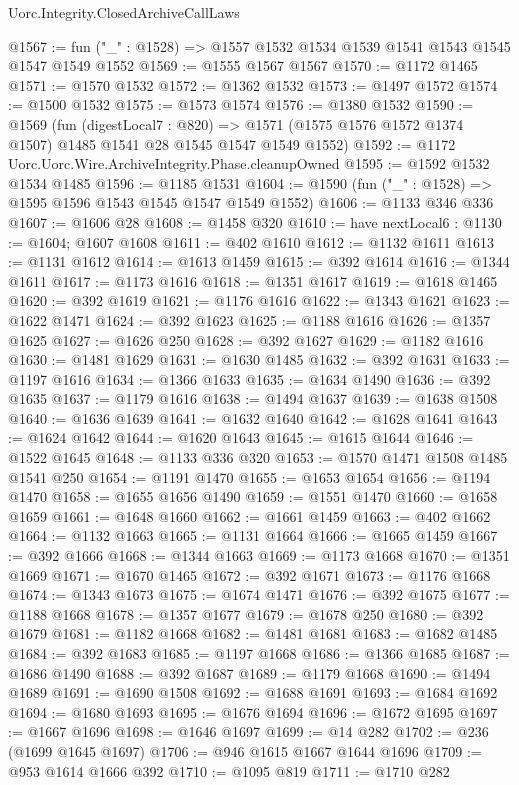 \begin{lexlean}{Uorc.Integrity.ClosedArchiveCallLaws}
\begin{coremodule}
@1567 := fun ("_" : @1528) => @1557 @1532 @1534 @1539 @1541 @1543 @1545 @1547 @1549 @1552
@1569 := @1555 @1567 @1567
@1570 := @1172 @1465
@1571 := @1570 @1532
@1572 := @1362 @1532
@1573 := @1497 @1572
@1574 := @1500 @1532
@1575 := @1573 @1574
@1576 := @1380 @1532
@1590 := @1569
    (fun (digestLocal7 : @820) =>
    @1571 (@1575 @1576 @1572 @1374 @1507) @1485 @1541 @28 @1545 @1547 @1549 @1552)
@1592 := @1172 Uorc.Uorc.Wire.ArchiveIntegrity.Phase.cleanupOwned
@1595 := @1592 @1532 @1534 @1485
@1596 := @1185 @1531
@1604 := @1590 (fun ("_" : @1528) => @1595 @1596 @1543 @1545 @1547 @1549 @1552)
@1606 := @1133 @346 @336
@1607 := @1606 @28
@1608 := @1458 @320
@1610 := have nextLocal6 : @1130 := @1604; @1607 @1608
@1611 := @402 @1610
@1612 := @1132 @1611
@1613 := @1131 @1612
@1614 := @1613 @1459
@1615 := @392 @1614
@1616 := @1344 @1611
@1617 := @1173 @1616
@1618 := @1351 @1617
@1619 := @1618 @1465
@1620 := @392 @1619
@1621 := @1176 @1616
@1622 := @1343 @1621
@1623 := @1622 @1471
@1624 := @392 @1623
@1625 := @1188 @1616
@1626 := @1357 @1625
@1627 := @1626 @250
@1628 := @392 @1627
@1629 := @1182 @1616
@1630 := @1481 @1629
@1631 := @1630 @1485
@1632 := @392 @1631
@1633 := @1197 @1616
@1634 := @1366 @1633
@1635 := @1634 @1490
@1636 := @392 @1635
@1637 := @1179 @1616
@1638 := @1494 @1637
@1639 := @1638 @1508
@1640 := @1636 @1639
@1641 := @1632 @1640
@1642 := @1628 @1641
@1643 := @1624 @1642
@1644 := @1620 @1643
@1645 := @1615 @1644
@1646 := @1522 @1645
@1648 := @1133 @336 @320
@1653 := @1570 @1471 @1508 @1485 @1541 @250
@1654 := @1191 @1470
@1655 := @1653 @1654
@1656 := @1194 @1470
@1658 := @1655 @1656 @1490
@1659 := @1551 @1470
@1660 := @1658 @1659
@1661 := @1648 @1660
@1662 := @1661 @1459
@1663 := @402 @1662
@1664 := @1132 @1663
@1665 := @1131 @1664
@1666 := @1665 @1459
@1667 := @392 @1666
@1668 := @1344 @1663
@1669 := @1173 @1668
@1670 := @1351 @1669
@1671 := @1670 @1465
@1672 := @392 @1671
@1673 := @1176 @1668
@1674 := @1343 @1673
@1675 := @1674 @1471
@1676 := @392 @1675
@1677 := @1188 @1668
@1678 := @1357 @1677
@1679 := @1678 @250
@1680 := @392 @1679
@1681 := @1182 @1668
@1682 := @1481 @1681
@1683 := @1682 @1485
@1684 := @392 @1683
@1685 := @1197 @1668
@1686 := @1366 @1685
@1687 := @1686 @1490
@1688 := @392 @1687
@1689 := @1179 @1668
@1690 := @1494 @1689
@1691 := @1690 @1508
@1692 := @1688 @1691
@1693 := @1684 @1692
@1694 := @1680 @1693
@1695 := @1676 @1694
@1696 := @1672 @1695
@1697 := @1667 @1696
@1698 := @1646 @1697
@1699 := @14 @282
@1702 := @236 (@1699 @1645 @1697)
@1706 := @946 @1615 @1667 @1644 @1696
@1709 := @953 @1614 @1666 @392
@1710 := @1095 @819
@1711 := @1710 @282

\end{coremodule}
\end{lexlean}
